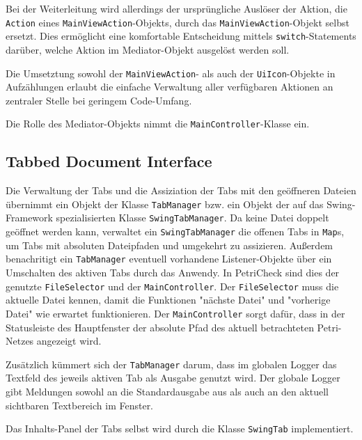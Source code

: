 Bei der Weiterleitung wird allerdings der ursprüngliche Auslöser der Aktion, die
\texttt{Action} eines \texttt{MainViewAction}-Objekts, durch das
\texttt{MainViewAction}-Objekt selbst ersetzt. Dies ermöglicht eine komfortable
Entscheidung mittels \texttt{switch}-Statements darüber, welche Aktion im
Mediator-Objekt ausgelöst werden soll.

Die Umsetztung sowohl der \texttt{MainViewAction}- als auch der
\texttt{UiIcon}-Objekte in Aufzählungen erlaubt die einfache Verwaltung aller
verfügbaren Aktionen an zentraler Stelle bei geringem Code-Umfang.

Die Rolle des Mediator-Objekts nimmt die \texttt{MainController}-Klasse ein.

\subsection{Tabbed Document Interface}
Die Verwaltung der Tabs und die Assiziation der Tabs mit den geöffneren Dateien
übernimmt ein Objekt der Klasse \texttt{TabManager} bzw. ein Objekt der auf das
Swing-Framework spezialisierten Klasse \texttt{SwingTabManager}. Da keine Datei
doppelt geöffnet werden kann, verwaltet ein \texttt{SwingTabManager} die offenen
Tabs in \texttt{Map}s, um Tabs mit absoluten Dateipfaden und umgekehrt zu
assizieren. Außerdem benachritigt ein \texttt{TabManager} eventuell vorhandene
Listener-Objekte über ein Umschalten des aktiven Tabs durch das Anwendy. In
PetriCheck sind dies der genutzte \texttt{FileSelector} und der
\texttt{MainController}. Der \texttt{FileSelector} muss die aktuelle Datei
kennen, damit die Funktionen "nächste Datei" und "vorherige Datei" wie erwartet
funktionieren. Der \texttt{MainController} sorgt dafür, dass in der Statusleiste
des Hauptfenster der absolute Pfad des aktuell betrachteten Petri-Netzes
angezeigt wird.

Zusätzlich kümmert sich der \texttt{TabManager} darum, dass im globalen Logger
das Textfeld des jeweils aktiven Tab als Ausgabe genutzt wird. Der globale
Logger gibt Meldungen sowohl an die Standardausgabe aus als auch an den aktuell
sichtbaren Textbereich im Fenster.

Das Inhalts-Panel der Tabs selbst wird durch die Klasse \texttt{SwingTab}
implementiert.